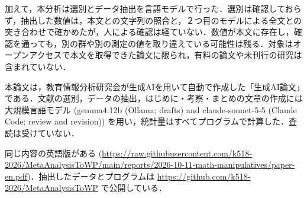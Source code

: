 \documentclass[
  lualatex, ja=standard, paper={182mm,257mm}, twocolumn, fontsize=8.5pt, baselineskip=13.5pt,
  line_length=24zw, column_gap=6.1mm, number_of_lines=45, head_space=24.5mm, gutter=16.25mm
]{jlreq}
\newcommand{\chapspaced}[1]{\par\vspace{13.5pt}\needspace{4\baselineskip}{\centering\gtfamily\bfseries #1\par}\nopagebreak}
\begin{document}
加えて，本分析は選別とデータ抽出を言語モデルで行った．選別は確認しておらず，抽出した数値は，本文との文字列の照合と，２つ目のモデルによる全文との突き合わせで確かめたが，人による確認は経ていない．数値が本文に存在し，確認を通っても，別の群や別の測定の値を取り違えている可能性は残る．対象はオープンアクセスで本文を取得できた論文に限られ，有料の論文や未刊行の研究は含まれていない．

\chapspaced{付\hspace{1\zw}記}
本論文は，教育情報分析研究会が生成AIを用いて自動で作成した「生成AI論文」である．文献の選別，データの抽出，はじめに・考察・まとめの文章の作成には大規模言語モデル (gemma4:12b (Ollama; drafts) and claude-sonnet-5-5 (Claude Code; review and revision)) を用い，統計量はすべてプログラムで計算した．査読は受けていない．

同じ内容の英語版がある (\url{https://raw.githubusercontent.com/k518-2026/MetaAnalysisToWP/main/reports/2026-10-11-math-manipulatives/paper-en.pdf})．抽出したデータとプログラムは \url{https://github.com/k518-2026/MetaAnalysisToWP} で公開している．
\end{document}

